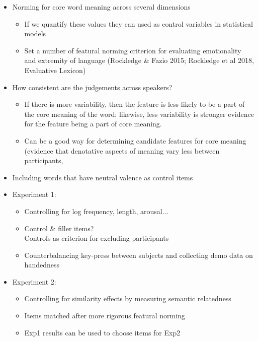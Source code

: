 \documentclass[12pt,letterpaper,table,svgnames,dvipsnames]{article}
\begin{document}
\begin{itemize}
    \item Norming for core word meaning across several dimensions
    \begin{itemize}
        \item If we quantify these values they can used as control variables in statistical models
        
        \item Set a number of featural norming criterion for evaluating emotionality and extremity of language (Rockledge \& Fazio 2015; Rockledge et al 2018, Evaluative Lexicon)
    \end{itemize}

    \item How consistent are the judgements across speakers? 
    \begin{itemize}
        \item If there is more variability, then the feature is less likely to be a part of the core meaning of the word; likewise, less variability is stronger evidence for the feature being a part of core meaning.
        \item Can be a good way for determining candidate features for core meaning (evidence that denotative aspects of meaning vary less between participants, 
    \end{itemize}
   
    \item Including words that have neutral valence as control items
    
    \item Experiment 1:
    \begin{itemize}
        \item Controlling for log frequency, length, arousal...
        \item Control \& filler items?\\
            Controls as criterion for excluding participants
        \item Counterbalancing key-press between subjects and collecting demo data on handedness
    \end{itemize}
    
    \item Experiment 2:
    \begin{itemize}
        \item Controlling for similarity effects by measuring semantic relatedness
        \item Items matched after more rigorous featural norming
        \item Exp1 results can be used to choose items for Exp2
    \end{itemize}

\end{itemize}
\end{document}
